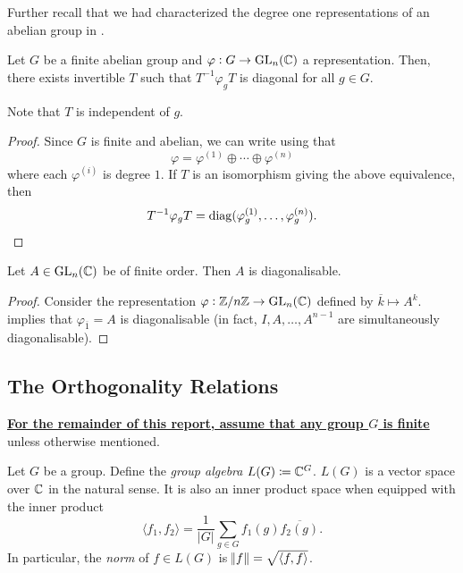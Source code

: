 		Further recall that we had characterized the degree one representations of an abelian group in .

		\begin{corollary}
			\label{cor: rep of finite abelian group is diagonalizable}
			Let $G$ be a finite abelian group and $\varphi : G \to \operatorname{GL}_n(\mathbb{C})$ a representation. Then, there exists invertible $T$ such that $T^{-1}\varphi_g T$ is diagonal for all $g \in G$.
		\end{corollary}
		Note that $T$ is independent of $g$.
		\begin{proof}
			Since $G$ is finite and abelian, we can write using  that
			\[ \varphi = \varphi^{(1)} \oplus \cdots \oplus \varphi^{(n)} \]
			where each $\varphi^{(i)}$ is degree $1$. If $T$ is an isomorphism giving the above equivalence, then
			\[ T^{-1} \varphi_g T = \operatorname{diag}(\varphi^{(1)}_g,\ldots,\varphi^{(n)}_g). \]
		\end{proof}

		\begin{corollary}
			\label{cor: finite order diagonalisable}
			Let $A \in \operatorname{GL}_n(\mathbb{C})$ be of finite order. Then $A$ is diagonalisable.
		\end{corollary}
		\begin{proof}
			Consider the representation $\varphi : \mathbb{Z}/n\mathbb{Z} \to \operatorname{GL}_n(\mathbb{C})$ defined by $\overline{k} \mapsto A^k$.  implies that $\varphi_{\overline{1}} = A$ is diagonalisable (in fact, $I,A,\ldots,A^{n-1}$ are simultaneously diagonalisable).
		\end{proof}

	\subsection{The Orthogonality Relations}

		\begin{tcolorbox}[colframe=red!25,colback=red!25]
			\underline{\textbf{For the remainder of this report, assume that any group $G$ is finite}} unless otherwise mentioned.
		\end{tcolorbox}

		\begin{fdef}
			Let $G$ be a group. Define the \emph{group algebra} $L(G) \coloneqq \mathbb{C}^G$. $L(G)$ is a vector space over $\mathbb{C}$ in the natural sense. It is also an inner product space when equipped with the inner product
			\[ \langle f_1,f_2 \rangle = \frac{1}{|G|} \sum_{g \in G} f_1(g) \overline{f_2(g)}. \]
			In particular, the \emph{norm} of $f \in L(G)$ is $\norm{f} = \sqrt{\langle f,f\rangle}$.
		\end{fdef}

